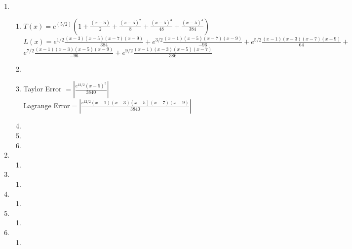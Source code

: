 \documentclass{article}
\begin{document}

\begin{enumerate}

\item \begin{enumerate}
\item $T(x)=e^{(5/2)}(1+\frac{(x-5)}{2}+\frac{(x-5)^2}{8}+\frac{(x-5)^3}{48}+\frac{(x-5)^4}{384})$ \\

$ L(x)=e^{1/2}\frac{(x-3)(x-5)(x-7)(x-9)}{384}+ e^{3/2}\frac{(x-1)(x-5)(x-7)(x-9)}{-96}+e^{5/2}\frac{(x-1)(x-3)(x-7)(x-9)}{64}+$\\$ e^{7/2}\frac{(x-1)(x-3)(x-5)(x-9)}{-96}+ e^{9/2}\frac{(x-1)(x-3)(x-5)(x-7)}{386}$

\item 
\item Taylor Error $=\left| \frac{e^{12/2}(x-5)^5}{3840}\right|$ \\
Lagrange Error$=\left| \frac{e^{12/2}(x-1)(x-3)(x-5)(x-7)(x-9)}{3840}\right|$ 
\item 
\item
\item 
\end{enumerate}
\item
\begin{enumerate} 
\item 
\end{enumerate}
\item
\begin{enumerate}
\item
\end{enumerate}
\item
\begin{enumerate}
\item
\end{enumerate}
\item
\begin{enumerate}
\item
\end{enumerate}
\item
\begin{enumerate}
\item
\end{enumerate}


\end{enumerate}
\end{document}
